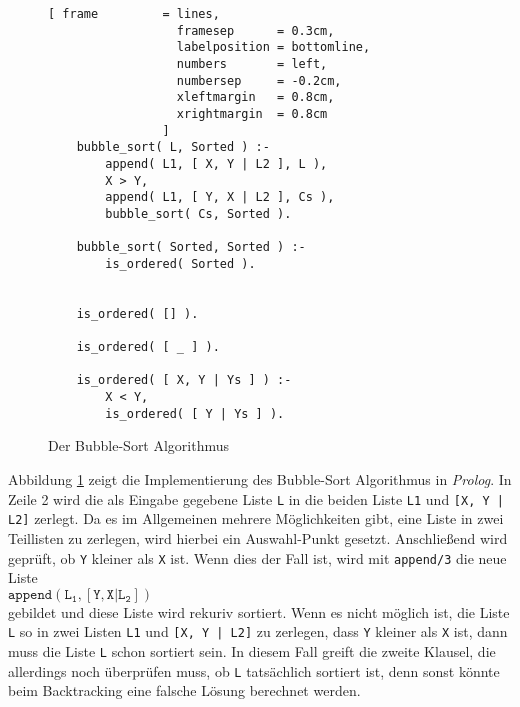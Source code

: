 \begin{figure}[!h]
  \centering
\begin{Verbatim}[ frame         = lines, 
                  framesep      = 0.3cm, 
                  labelposition = bottomline,
                  numbers       = left,
                  numbersep     = -0.2cm,
                  xleftmargin   = 0.8cm,
                  xrightmargin  = 0.8cm
                ]
    bubble_sort( L, Sorted ) :-
        append( L1, [ X, Y | L2 ], L ),
        X > Y,
        append( L1, [ Y, X | L2 ], Cs ),
        bubble_sort( Cs, Sorted ).
    
    bubble_sort( Sorted, Sorted ) :-
        is_ordered( Sorted ).
    
    
    is_ordered( [] ).
    
    is_ordered( [ _ ] ).
    
    is_ordered( [ X, Y | Ys ] ) :-
        X < Y,
        is_ordered( [ Y | Ys ] ).
\end{Verbatim}
\vspace*{-0.3cm}
  \caption{Der Bubble-Sort Algorithmus}
  \label{fig:bubble_sort}
\end{figure}

Abbildung \ref{fig:bubble_sort} zeigt die Implementierung des Bubble-Sort Algorithmus in
\textsl{Prolog}.  In Zeile 2 wird die als Eingabe gegebene Liste \texttt{L} in die beiden
Liste \texttt{L1} und \texttt{[X, Y | L2]} zerlegt.  Da es im Allgemeinen mehrere
M\"{o}glichkeiten gibt,  eine Liste in zwei Teillisten zu zerlegen, wird hierbei ein
Auswahl-Punkt gesetzt.  Anschließend wird gepr\"{u}ft, ob \texttt{Y} kleiner als \texttt{X}
ist.  Wenn dies der Fall ist, wird mit \texttt{append/3} die neue Liste 
\\[0.1cm]
\hspace*{1.3cm} $\mathtt{append(L_1, [Y,X|L_2])}$ \\[0.1cm]
gebildet und diese Liste wird rekuriv sortiert.  Wenn es nicht m\"{o}glich ist,
die Liste \texttt{L} so in zwei Listen \texttt{L1} und \texttt{[X, Y | L2]} zu zerlegen,
dass \texttt{Y} kleiner als \texttt{X} ist, dann muss die Liste \texttt{L} schon sortiert
sein.  In diesem Fall greift die zweite Klausel, die allerdings noch \"{u}berpr\"{u}fen muss, ob
\texttt{L} tats\"{a}chlich sortiert ist, denn sonst k\"{o}nnte beim Backtracking eine falsche
L\"{o}sung berechnet werden.

